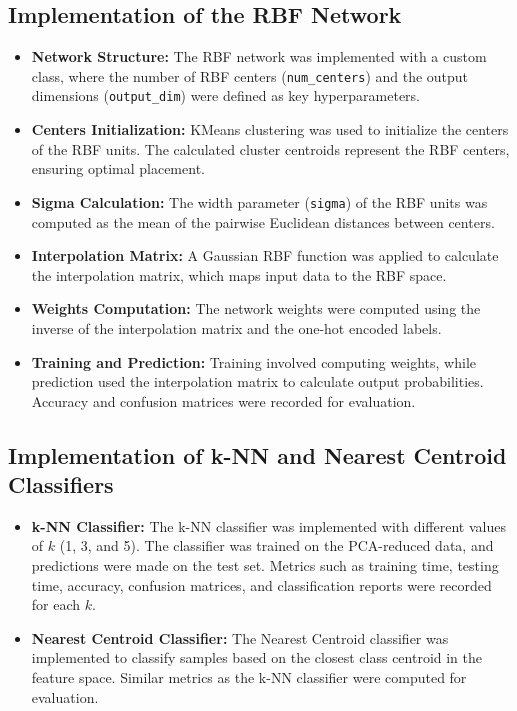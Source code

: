 \documentclass[lettersize,journal]{IEEEtran}
\begin{document}
\subsection{\textbf{Implementation of the RBF Network}}
\begin{itemize}
    \item \textbf{Network Structure:} 
    The RBF network was implemented with a custom class, where the number of RBF centers (\texttt{num\_centers}) and the output dimensions (\texttt{output\_dim}) were defined as key hyperparameters.
    \item \textbf{Centers Initialization:} 
    KMeans clustering was used to initialize the centers of the RBF units. The calculated cluster centroids represent the RBF centers, ensuring optimal placement.
    \item \textbf{Sigma Calculation:} 
    The width parameter (\texttt{sigma}) of the RBF units was computed as the mean of the pairwise Euclidean distances between centers.
    \item \textbf{Interpolation Matrix:} 
    A Gaussian RBF function was applied to calculate the interpolation matrix, which maps input data to the RBF space.
    \item \textbf{Weights Computation:} 
    The network weights were computed using the inverse of the interpolation matrix and the one-hot encoded labels.
    \item \textbf{Training and Prediction:} 
    Training involved computing weights, while prediction used the interpolation matrix to calculate output probabilities. Accuracy and confusion matrices were recorded for evaluation.
\end{itemize}

\subsection{\textbf{Implementation of k-NN and Nearest Centroid Classifiers}}
\begin{itemize}
    \item \textbf{k-NN Classifier:}
    The k-NN classifier was implemented with different values of $k$ (1, 3, and 5). The classifier was trained on the PCA-reduced data, and predictions were made on the test set. Metrics such as training time, testing time, accuracy, confusion matrices, and classification reports were recorded for each $k$.
    \item \textbf{Nearest Centroid Classifier:}
    The Nearest Centroid classifier was implemented to classify samples based on the closest class centroid in the feature space. Similar metrics as the k-NN classifier were computed for evaluation.
\end{itemize}
\end{document}

